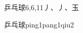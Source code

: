 \begin{entry}{乒乓球}{6,6,11}{⼃、⼃、⽟}
  \begin{phonetics}{乒乓球}{ping1pang1qiu2}
  \end{phonetics}
\end{entry}

